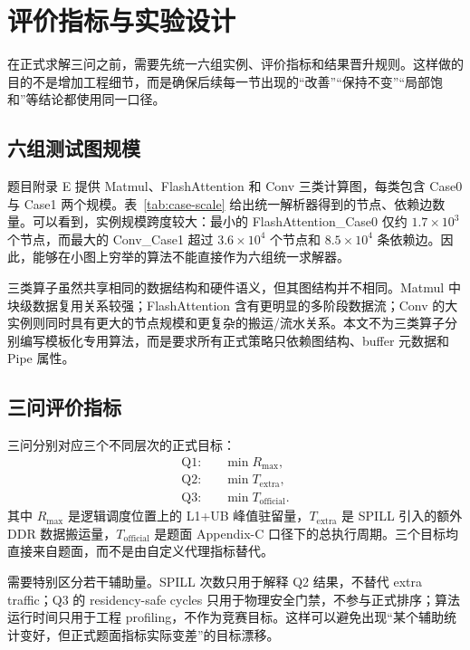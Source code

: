 \section{评价指标与实验设计}

在正式求解三问之前，需要先统一六组实例、评价指标和结果晋升规则。这样做的目的不是增加工程细节，而是确保后续每一节出现的“改善”“保持不变”“局部饱和”等结论都使用同一口径。

\subsection{六组测试图规模}

题目附录 E 提供 Matmul、FlashAttention 和 Conv 三类计算图，每类包含 Case0 与 Case1 两个规模。表~\ref{tab:case-scale} 给出统一解析器得到的节点、依赖边数量。可以看到，实例规模跨度较大：最小的 FlashAttention\_Case0 仅约 $1.7\times10^3$ 个节点，而最大的 Conv\_Case1 超过 $3.6\times10^4$ 个节点和 $8.5\times10^4$ 条依赖边。因此，能够在小图上穷举的算法不能直接作为六组统一求解器。

\begin{table}[H]
    \centering
    \caption{六组 Appendix-E 计算图规模}
    \label{tab:case-scale}
    \resizebox{0.78\textwidth}{!}{}
\end{table}

三类算子虽然共享相同的数据结构和硬件语义，但其图结构并不相同。Matmul 中块级数据复用关系较强；FlashAttention 含有更明显的多阶段数据流；Conv 的大实例则同时具有更大的节点规模和更复杂的搬运/流水关系。本文不为三类算子分别编写模板化专用算法，而是要求所有正式策略只依赖图结构、buffer 元数据和 Pipe 属性。

\subsection{三问评价指标}

三问分别对应三个不同层次的正式目标：
\begin{align}
\text{Q1:}\quad &\min R_{\max},\\
\text{Q2:}\quad &\min T_{\mathrm{extra}},\\
\text{Q3:}\quad &\min T_{\mathrm{official}}.
\end{align}
其中 $R_{\max}$ 是逻辑调度位置上的 L1+UB 峰值驻留量，$T_{\mathrm{extra}}$ 是 SPILL 引入的额外 DDR 数据搬运量，$T_{\mathrm{official}}$ 是题面 Appendix-C 口径下的总执行周期。三个目标均直接来自题面，而不是由自定义代理指标替代。

需要特别区分若干辅助量。SPILL 次数只用于解释 Q2 结果，不替代 extra traffic；Q3 的 residency-safe cycles 只用于物理安全门禁，不参与正式排序；算法运行时间只用于工程 profiling，不作为竞赛目标。这样可以避免出现“某个辅助统计变好，但正式题面指标实际变差”的目标漂移。


